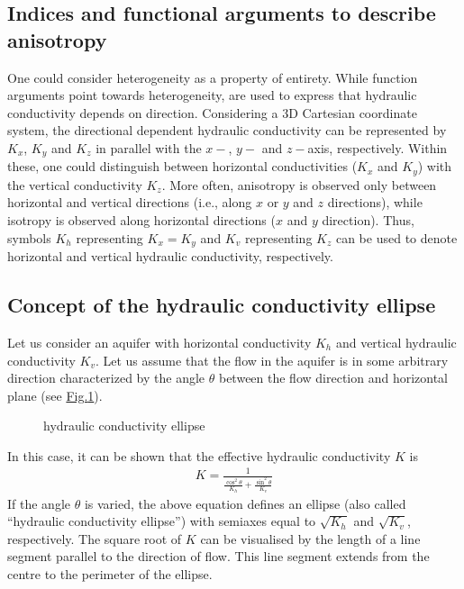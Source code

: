 \documentclass[letterpaper,10pt,english]{jupyterBook}
\begin{document}
\subsection{Indices and functional arguments to describe anisotropy}
\label{\detokenize{content/flow/L5/15_het_iso:indices-and-functional-arguments-to-describe-anisotropy}}
\sphinxAtStartPar
One could consider heterogeneity as a property of entirety. While function arguments point towards heterogeneity,  are
used to express that hydraulic conductivity depends on direction. Considering a 3\sphinxhyphen{}D Cartesian coordinate system, the directional dependent hydraulic conductivity can be represented by \(K_x\), \(K_y\) and \(K_z\) in parallel with the \(x-\), \(y-\) and \(z-\)axis, respectively. Within these, one could distinguish between horizontal conductivities (\(K_x\) and \(K_y\)) with the vertical conductivity \(K_z\). More often, anisotropy is observed only between horizontal and vertical directions (i.e., along \(x\) or \(y\) and \(z\) directions), while isotropy is observed along horizontal directions (\(x\) and \(y\) direction). Thus, symbols \(K_h\) representing \(K_x = K_y\) and \(K_v\) representing \(K_z\) can be used to denote horizontal and vertical hydraulic conductivity, respectively.


\subsection{Concept of the hydraulic conductivity ellipse}
\label{\detokenize{content/flow/L5/15_het_iso:concept-of-the-hydraulic-conductivity-ellipse}}
\sphinxAtStartPar
Let us consider an aquifer with horizontal conductivity \(K_h\) and vertical hydraulic conductivity \(K_v\). Let us assume that the flow in the aquifer is in some arbitrary direction characterized by the angle \(\theta\) between the flow direction and horizontal plane (see \hyperref[\detokenize{content/flow/L5/15_het_iso:k-ellipse}]{Fig.\@ \ref{\detokenize{content/flow/L5/15_het_iso:k-ellipse}}}).

\begin{figure}[htbp]
\centering
\capstart

\noindent{}
\caption{hydraulic conductivity ellipse}\label{\detokenize{content/flow/L5/15_het_iso:k-ellipse}}\end{figure}

\sphinxAtStartPar
In this case, it can be shown that the effective hydraulic conductivity \(K\) is
\begin{equation*}
\begin{split}
K = \frac{1}{\frac{\cos^2\theta}{K_h}+\frac{\sin^2\theta}{K_v}} 
\end{split}
\end{equation*}
\sphinxAtStartPar
If the angle \(\theta\) is varied, the above equation defines an ellipse (also called “hydraulic conductivity ellipse”) with semi\sphinxhyphen{}axes equal to \(\surd{K_h}\) and \(\surd{K_v}\), respectively. The square root of \(K\) can be visualised by the length of a line segment parallel to the direction of flow. This line segment extends from the centre to the perimeter of the ellipse.
\end{document}
